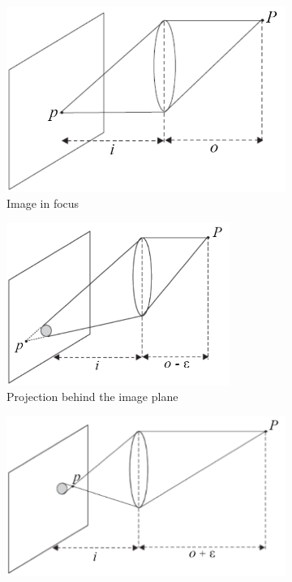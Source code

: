 \begin{description}
\begin{remark}
            \begin{figure}[H]
                \centering
                \begin{subfigure}{0.3\textwidth}
                    \centering
                    \includegraphics[width=\textwidth]{./img/thin_lens_formation1.png}
                    \caption{Image in focus}
                \end{subfigure}
                \begin{subfigure}{0.3\textwidth}
                    \centering
                    \includegraphics[width=0.8\textwidth]{./img/thin_lens_formation2.png}
                    \caption{Projection behind the image plane}
                \end{subfigure}
                \begin{subfigure}{0.3\textwidth}
                    \centering
                    \includegraphics[width=\textwidth]{./img/thin_lens_formation3.png}

\end{subfigure}
\end{figure}
\end{remark}
\end{description}
